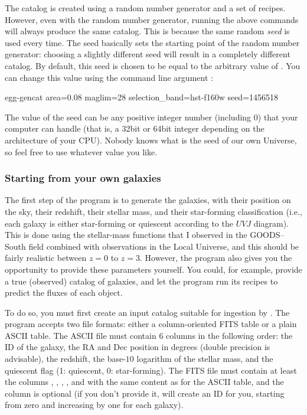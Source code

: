 \documentclass[12pt,a4paper]{article}
\newcommand{\uvj}{$UVJ$\xspace}
\begin{document}
The catalog is created using a random number generator and a set of recipes. However, even with the random number generator, running the above commands will always produce the same catalog. This is because the same random \emph{seed} is used every time. The seed basically sets the starting point of the random number generator: choosing a slightly different seed will result in a completely different catalog. By default, this seed is chosen to be equal to the arbitrary value of . You can change this value using the command line argument :
\begin{bashcode}
egg-gencat area=0.08 maglim=28 selection_band=hst-f160w seed=1456518
\end{bashcode}
The value of the seed can be any positive integer number (including 0) that your computer can handle (that is, a 32bit or 64bit integer depending on the architecture of your CPU). Nobody knows what is the seed of our own Universe, so feel free to use whatever value you like.

\subsubsection{Starting from your own galaxies}
The first step of the program is to generate the galaxies, with their position on the sky, their redshift, their stellar mass, and their star-forming classification (i.e., each galaxy is either star-forming or quiescent according to the \uvj diagram). This is done using the stellar-mass functions that I observed in the GOODS--South field combined with observations in the Local Universe, and this should be fairly realistic between $z=0$ to $z=3$. However, the program also gives you the opportunity to provide these parameters yourself. You could, for example, provide a true (observed) catalog of galaxies, and let the program run its recipes to predict the fluxes of each object.

To do so, you must first create an input catalog suitable for ingestion by . The program accepts two file formats: either a column-oriented FITS table or a plain ASCII table. The ASCII file must contain $6$ columns in the following order: the ID of the galaxy, the RA and Dec position in degrees (double precision is advisable), the redshift, the base-$10$ logarithm of the stellar mass, and the quiescent flag (1: quiescent, 0: star-forming). The FITS file must contain at least the columns , , , , and  with the same content as for the ASCII table, and the column  is optional (if you don't provide it,  will create an ID for you, starting from zero and increasing by one for each galaxy).
\end{document}
